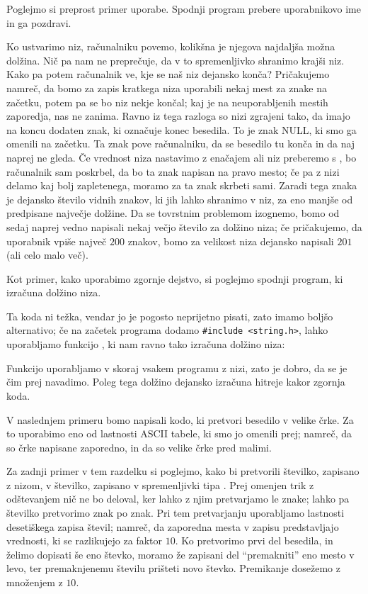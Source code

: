 Poglejmo si preprost primer uporabe.
Spodnji program prebere uporabnikovo ime in ga pozdravi.


Ko ustvarimo niz, računalniku povemo, kolikšna je njegova najdaljša možna
dolžina.
Nič pa nam ne preprečuje, da v to spremenljivko shranimo krajši niz.
Kako pa potem računalnik ve, kje se naš niz dejansko konča?
Pričakujemo namreč, da bomo za zapis kratkega niza uporabili nekaj mest za znake
na začetku, potem pa se bo niz nekje končal; kaj je na neuporabljenih mestih
zaporedja, nas ne zanima.
Ravno iz tega razloga so nizi zgrajeni tako, da imajo na koncu dodaten znak, ki
označuje konec besedila.
To je znak NULL, ki smo ga omenili na začetku.
Ta znak pove računalniku, da se besedilo tu konča in da naj naprej ne gleda.
Če vrednost niza nastavimo z enačajem ali niz preberemo s , bo
računalnik sam poskrbel, da bo ta znak napisan na pravo mesto; če pa z nizi
delamo kaj bolj zapletenega, moramo za ta znak skrbeti sami.
Zaradi tega znaka je dejansko število vidnih znakov, ki jih lahko shranimo v
niz, za eno manjše od predpisane največje dolžine.
Da se tovrstnim problemom izognemo, bomo od sedaj naprej vedno napisali nekaj
večjo število za dolžino niza; če pričakujemo, da uporabnik vpiše največ $200$
znakov, bomo za velikost niza dejansko napisali $201$ (ali celo malo več).

Kot primer, kako uporabimo zgornje dejstvo, si poglejmo spodnji program, ki
izračuna dolžino niza.


Ta koda ni težka, vendar jo je pogosto neprijetno pisati, zato imamo boljšo
alternativo; če na začetek programa dodamo \verb+#include <string.h>+, lahko
uporabljamo funkcijo , ki nam ravno tako izračuna dolžino niza:


Funkcijo  uporabljamo v skoraj vsakem programu z nizi, zato je
dobro, da se je čim prej navadimo.
Poleg tega  dolžino dejansko izračuna hitreje kakor zgornja koda.

V naslednjem primeru bomo napisali kodo, ki pretvori besedilo v velike črke.
Za to uporabimo eno od lastnosti ASCII tabele, ki smo jo omenili prej; namreč,
da so črke napisane zaporedno, in da so velike črke pred malimi.


Za zadnji primer v tem razdelku si poglejmo, kako bi pretvorili številko,
zapisano z nizom, v številko, zapisano v spremenljivki tipa .
Prej omenjen trik z odštevanjem nič ne bo deloval, ker lahko z njim
pretvarjamo le znake; lahko pa številko pretvorimo znak po znak.
Pri tem pretvarjanju uporabljamo lastnosti desetiškega zapisa števil; namreč,
da zaporedna mesta v zapisu predstavljajo vrednosti, ki se razlikujejo za
faktor $10$.
Ko pretvorimo prvi del besedila, in želimo dopisati še eno števko, moramo že
zapisani del \enquote{premakniti} eno mesto v levo, ter premaknjenemu številu
prišteti novo števko.
Premikanje dosežemo z množenjem z $10$.

